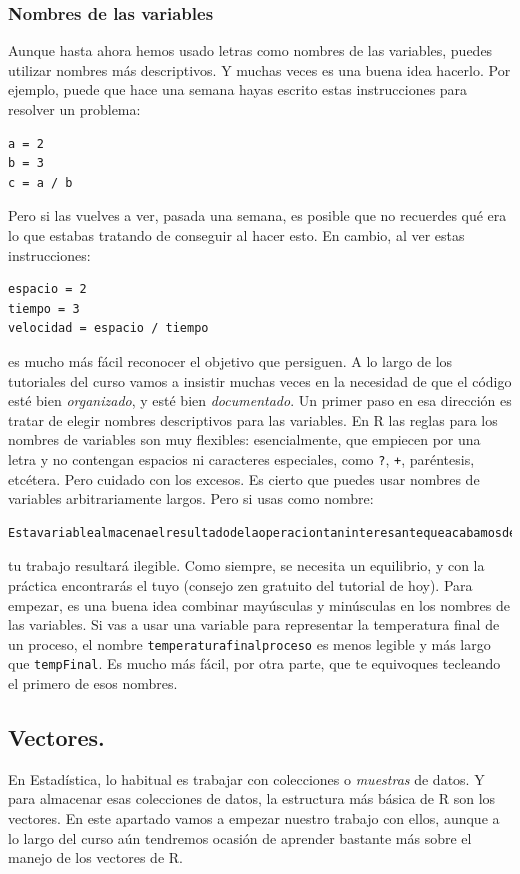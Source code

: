 \documentclass[10pt,a4paper]{article}\usepackage[]{graphicx}\usepackage[]{color}
\newcounter {cont01}
\begin{document}
\subsubsection*{Nombres de las variables}

Aunque hasta ahora hemos usado letras como nombres de las variables, puedes utilizar nombres más descriptivos. Y muchas veces es una buena idea hacerlo. Por ejemplo,  puede que hace una semana hayas escrito estas instrucciones para resolver un problema:
\begin{verbatim}
a = 2
b = 3
c = a / b
\end{verbatim}
Pero si las vuelves a ver, pasada una semana, es posible que no recuerdes qué era lo que estabas tratando de conseguir al hacer esto. En cambio, al ver estas instrucciones:
\begin{verbatim}
espacio = 2
tiempo = 3
velocidad = espacio / tiempo
\end{verbatim}
es mucho más fácil reconocer el objetivo que persiguen. A lo largo de los tutoriales del curso vamos a insistir muchas veces en la necesidad de que el código esté bien {\em organizado}, y esté bien {\em documentado}. Un primer paso en esa dirección es tratar de elegir nombres descriptivos para las variables. En R las reglas para los nombres de variables son muy flexibles: esencialmente, que empiecen por una letra y no contengan espacios ni caracteres especiales, como {\tt ?}, {\tt +}, paréntesis, etcétera. Pero cuidado con los excesos. Es cierto que puedes usar nombres de variables arbitrariamente largos.  Pero si usas como nombre:
\begin{verbatim}
Estavariablealmacenaelresultadodelaoperaciontaninteresantequeacabamosdehacer
\end{verbatim}
tu trabajo resultará ilegible. Como siempre, se necesita un equilibrio, y con la práctica encontrarás el tuyo (consejo zen gratuito del tutorial de hoy). Para empezar, es una buena idea combinar mayúsculas y minúsculas en los nombres de las variables. Si  vas a usar una variable para representar la temperatura final de un proceso, el nombre {\tt temperaturafinalproceso} es menos legible y más largo que {\tt tempFinal}. Es mucho más fácil, por otra parte, que te equivoques tecleando el primero de esos nombres.

\subsection{Vectores.}

En Estadística, lo habitual es trabajar con colecciones o {\em muestras} de datos. Y para almacenar esas colecciones de datos, la estructura más básica de R son los vectores. En este apartado vamos a empezar nuestro trabajo con ellos, aunque a lo largo del curso aún tendremos ocasión de aprender bastante más sobre el manejo de los vectores de R.
\end{document}
